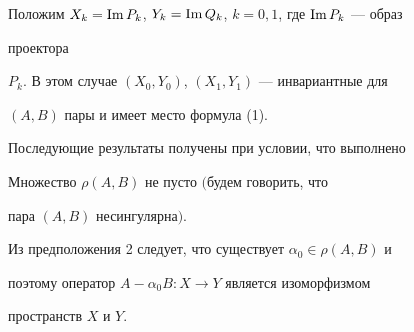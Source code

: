  


Положим $X_k=\operatorname{Im} P_k$, $Y_k=\operatorname{Im} Q_k$, $k=0,1$, где $\operatorname{Im} P_k$ --- образ 


проектора 


$P_k$. В этом случае $(X_0,Y_0)$, $(X_1,Y_1)$ --- инвариантные для 


$(A,B)$ пары и имеет место формула (1). 


 


Последующие результаты получены при условии, что выполнено 


 


\begin{assmp} 


Множество $\rho(A,B)$ не пусто $($будем говорить, что 


пара $(A,B)$ не\-син\-гулярна$)$. 


\end{assmp} 


 


Из предположения 2 следует, что существует $\alpha_0\in\rho(A,B)$ и 


поэтому оператор $A-\alpha_0 B:X\to Y$ является изоморфизмом 


пространств $X$ и $Y$. 


 


